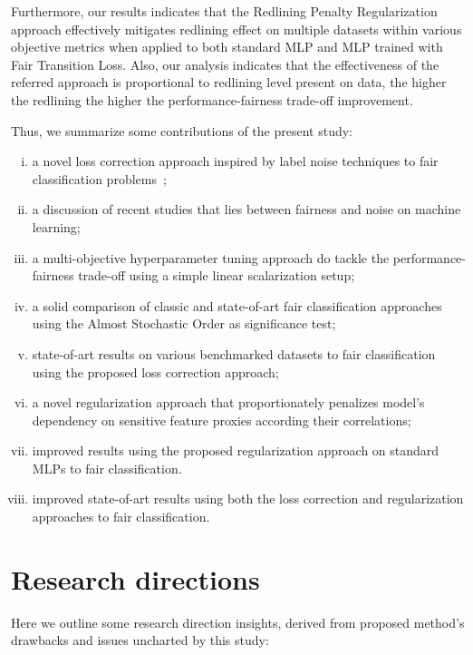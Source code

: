 Furthermore, our results indicates that the Redlining Penalty Regularization approach effectively mitigates redlining effect on multiple datasets within various objective metrics when applied to both standard MLP and MLP trained with Fair Transition Loss. Also, our analysis indicates that the effectiveness of the referred approach is proportional to redlining level present on data, the higher the redlining the higher the performance-fairness trade-off improvement.

Thus, we summarize some contributions of the present study:

\begin{enumerate}[(i)]
    \item a novel loss correction approach inspired by label noise techniques to fair classification problems~\citep{Canalli2024};
    \item a discussion of recent studies that lies between fairness and noise on machine learning;
    \item a multi-objective hyperparameter tuning approach do tackle the performance-fairness trade-off using a simple linear scalarization setup;
    \item a solid comparison of classic and state-of-art fair classification approaches using the Almost Stochastic Order as significance test;
    \item state-of-art results on various benchmarked datasets to fair classification using the proposed loss correction approach;
    \item a novel regularization approach that proportionately penalizes model's dependency on sensitive feature proxies according their correlations;
    \item improved results using the proposed regularization approach on standard MLPs to fair classification.
    \item improved state-of-art results using both the loss correction and regularization approaches to fair classification.
\end{enumerate}

\section{Research directions}

Here we outline some research direction insights, derived from proposed method's drawbacks and issues uncharted by this study:

